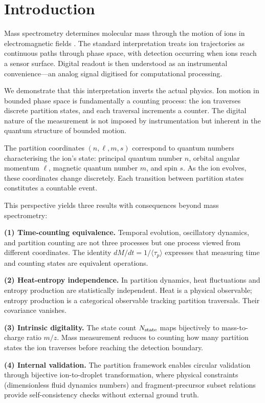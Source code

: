 \section{Introduction}
\label{sec:introduction}

Mass spectrometry determines molecular mass through the motion of ions in electromagnetic fields \citep{gross2017}. The standard interpretation treats ion trajectories as continuous paths through phase space, with detection occurring when ions reach a sensor surface. Digital readout is then understood as an instrumental convenience---an analog signal digitised for computational processing.

We demonstrate that this interpretation inverts the actual physics. Ion motion in bounded phase space is fundamentally a counting process: the ion traverses discrete partition states, and each traversal increments a counter. The digital nature of the measurement is not imposed by instrumentation but inherent in the quantum structure of bounded motion.

The partition coordinates $(n, \ell, m, s)$ correspond to quantum numbers characterising the ion's state: principal quantum number $n$, orbital angular momentum $\ell$, magnetic quantum number $m$, and spin $s$. As the ion evolves, these coordinates change discretely. Each transition between partition states constitutes a countable event.

This perspective yields three results with consequences beyond mass spectrometry:

\textbf{(1) Time-counting equivalence.} Temporal evolution, oscillatory dynamics, and partition counting are not three processes but one process viewed from different coordinates. The identity $dM/dt = 1/\langle\tau_p\rangle$ expresses that measuring time and counting states are equivalent operations.

\textbf{(2) Heat-entropy independence.} In partition dynamics, heat fluctuations and entropy production are statistically independent. Heat is a physical observable; entropy production is a categorical observable tracking partition traversals. Their covariance vanishes.

\textbf{(3) Intrinsic digitality.} The state count $N_{\mathrm{state}}$ maps bijectively to mass-to-charge ratio $m/z$. Mass measurement reduces to counting how many partition states the ion traverses before reaching the detection boundary.

\textbf{(4) Internal validation.} The partition framework enables circular validation through bijective ion-to-droplet transformation, where physical constraints (dimensionless fluid dynamics numbers) and fragment-precursor subset relations provide self-consistency checks without external ground truth.

